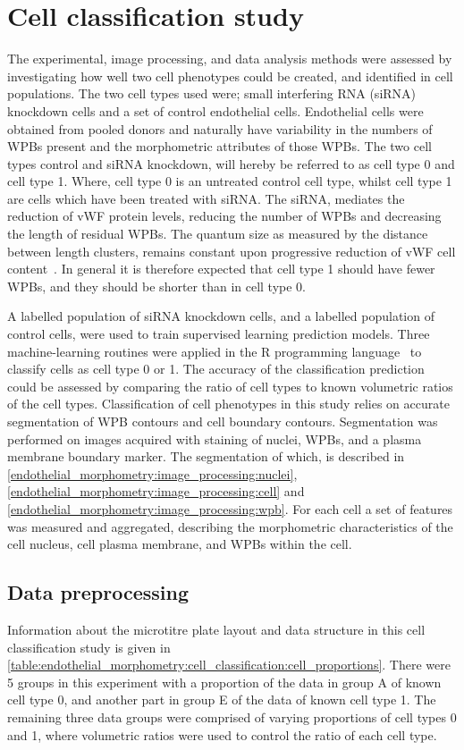 \section{Cell classification study}
\label{endothelial_morphometry:cell_classification}
The experimental, image processing, and data analysis methods were assessed by investigating how well two cell phenotypes could be created, and identified in cell populations. The two cell types used were; small interfering RNA (siRNA) knockdown cells and a set of control endothelial cells. Endothelial cells were obtained from pooled donors and naturally have variability in the numbers of WPBs present and the morphometric attributes of those WPBs. The two cell types control and siRNA knockdown, will hereby be referred to as cell type 0 and cell type 1. Where, cell type 0 is an untreated control cell type, whilst cell type 1 are cells which have been treated with siRNA. The siRNA, mediates the reduction of vWF protein levels, reducing the number of WPBs and decreasing the length of residual WPBs. The quantum size as measured by the distance between length clusters, remains constant upon progressive reduction of vWF cell content~\cite{Ferraro2014}. In general it is therefore expected that cell type 1 should have fewer WPBs, and they should be shorter than in cell type 0.

A labelled population of siRNA knockdown cells, and a labelled population of control cells, were used to train supervised learning prediction models. Three machine-learning routines were applied in the R programming language~\cite{RCoreTeam2014} to classify cells as cell type 0 or 1. The accuracy of the classification prediction could be assessed by comparing the ratio of cell types to known volumetric ratios of the cell types. Classification of cell phenotypes in this study relies on accurate segmentation of WPB contours and cell boundary contours. Segmentation was performed on images acquired with staining of nuclei, WPBs, and a plasma membrane boundary marker. The segmentation of which, is described in \autoref{endothelial_morphometry:image_processing:nuclei}, \autoref{endothelial_morphometry:image_processing:cell} and \autoref{endothelial_morphometry:image_processing:wpb}. For each cell a set of features was measured and aggregated, describing the morphometric characteristics of the cell nucleus, cell plasma membrane, and WPBs within the cell.

\subsection{Data preprocessing}
\label{endothelial_morphometry:cell_classification:data_preprocessing}
Information about the microtitre plate layout and data structure in this cell classification study is given in \autoref{table:endothelial_morphometry:cell_classification:cell_proportions}. There were 5 groups in this experiment with a proportion of the data in group A of known cell type 0, and another part in group E of the data of known cell type 1. The remaining three data groups were comprised of varying proportions of cell types 0 and 1, where volumetric ratios were used to control the ratio of each cell type.

